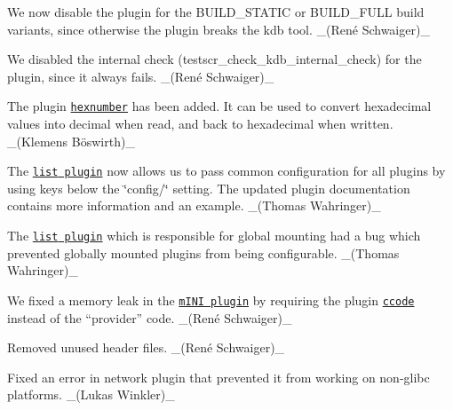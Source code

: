 \begin{DoxyItemize}
\item We now disable the plugin for the {\ttfamily B\+U\+I\+L\+D\+\_\+\+S\+T\+A\+T\+IC} or {\ttfamily B\+U\+I\+L\+D\+\_\+\+F\+U\+LL} build variants, since otherwise the plugin breaks the {\ttfamily kdb} tool. \+\_\+(René Schwaiger)\+\_\+
\item We disabled the internal check ({\ttfamily testscr\+\_\+check\+\_\+kdb\+\_\+internal\+\_\+check}) for the plugin, since it always fails. \+\_\+(René Schwaiger)\+\_\+
\end{DoxyItemize}


\begin{DoxyItemize}
\item The plugin \href{https://www.libelektra.org/plugins/hexnumber}{\tt hexnumber} has been added. It can be used to convert hexadecimal values into decimal when read, and back to hexadecimal when written. \+\_\+(Klemens Böswirth)\+\_\+
\end{DoxyItemize}


\begin{DoxyItemize}
\item The \href{http://libelektra.org/plugins/list}{\tt {\ttfamily list} plugin} now allows us to pass common configuration for all plugins by using keys below the \char`\"{}config/\char`\"{} setting. The updated plugin documentation contains more information and an example. \+\_\+(\+Thomas Wahringer)\+\_\+
\item The \href{http://libelektra.org/plugins/list}{\tt {\ttfamily list} plugin} which is responsible for global mounting had a bug which prevented globally mounted plugins from being configurable. \+\_\+(\+Thomas Wahringer)\+\_\+
\end{DoxyItemize}


\begin{DoxyItemize}
\item We fixed a memory leak in the \href{https://libelektra.org/plugins/mini}{\tt m\+I\+NI plugin} by requiring the plugin \href{https://libelektra.org/plugins/ccode}{\tt {\ttfamily ccode}} instead of the “provider” {\ttfamily code}. \+\_\+(René Schwaiger)\+\_\+
\item Removed unused header files. \+\_\+(René Schwaiger)\+\_\+
\end{DoxyItemize}


\begin{DoxyItemize}
\item Fixed an error in network plugin that prevented it from working on non-\/glibc platforms. \+\_\+(\+Lukas Winkler)\+\_\+
\end{DoxyItemize}


